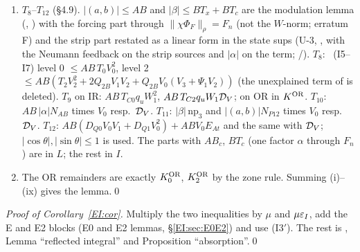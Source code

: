 \documentclass[11pt]{article}
\begin{document}
\begin{enumerate}[label=\textup{(\roman*)},leftmargin=2.2em]
\item $T_8$--$T_{12}$ (\S4.9). $|(a,b)|\le AB$ and $|\beta|\le BT_x+BT_c$ are the modulation lemma (, ) with the forcing part through $\|\chi\Phi_F\|_\rho=F_n$ (not the $W$-norm; erratum F) and the strip part restated as a linear form in the state sups (U-3, , with the Neumann feedback on the strip sources and $|\alpha|$ on the  term; \tC/\tR). $T_8$: \tS\ (I5--I7) level 0 $\le AB\,T_0V_0^2$, level 2 $\le AB(T_2V_2^2+2Q_{2B}V_1V_2+Q_{2B}V_0(V_3+\Psi_1V_2))$ (the unexplained  term of  is deleted). $T_9$ on IR: $AB\,T_{C0}q_uW_1^2$, $AB\,T_{C2}q_uW_1\mathcal D_V$; on OR in $K^{\mathrm{OR}}$. $T_{10}$: $AB\,|\alpha|N_{AB}$ times $V_0$ resp.\ $\mathcal D_V$. $T_{11}$: $|\beta|\,\mathrm{np}_3$ and $|(a,b)|N_{P12}$ times $V_0$ resp.\ $\mathcal D_V$. $T_{12}$: $AB(D_{Q0}V_0V_1+D_{Q1}V_0^2)+ABV_0E_{At}$ and the same with $\mathcal D_V$; $|\cos\theta|,|\sin\theta|\le1$ is used. The parts with $AB_c$, $BT_c$ (one factor $\alpha$ through $F_n$) are in $L$; the rest in $I$.
\item The OR remainders are exactly $K_0^{\mathrm{OR}}$, $K_2^{\mathrm{OR}}$ by the zone rule. Summing (i)--(ix) gives the lemma.\qed
\end{enumerate}
\noindent\emph{Proof of Corollary~\ref{EI:cor}.} Multiply the two inequalities by $\mu$ and $\mu\varepsilon_I$, add the E and E2 blocks (E0 and E2 lemmas, \S\ref{EI:sec:E0E2}) and use (I3$'$). The rest is , Lemma ``reflected integral'' and Proposition ``absorption''.\qed
\end{document}

